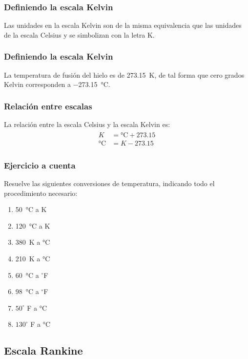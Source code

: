 \documentclass[14pt]{beamer}
\begin{document}
\begin{frame}
\frametitle{Definiendo la escala Kelvin}
Las unidades en la escala Kelvin son de la misma equivalencia que las unidades de la escala Celsius y se simbolizan con la letra K.
\end{frame}
\begin{frame}
\frametitle{Definiendo la escala Kelvin}    
La temperatura de fusión del hielo es de \SI{273.15}{\kelvin}, \pause de tal forma que cero grados Kelvin corresponden a \SI{-273.15}{\degreeCelsius}. 
\end{frame}
\begin{frame}
\frametitle{Relación entre escalas}
La relación entre la escala Celsius y la escala Kelvin es:
\pause
\begin{eqnarray*}
\begin{aligned}
K &= \unit{\degreeCelsius} + 273.15 \\[0.5em]
\unit{\degreeCelsius} &= K - 273.15
\end{aligned}
\end{eqnarray*}
\end{frame}
\begin{frame}
\frametitle{Ejercicio a cuenta}
Resuelve las siguientes conversiones de temperatura, indicando todo el procedimiento necesario:
\pause
\begin{multicols}{2}
\begin{enumerate}
\item \SI{50}{\degreeCelsius} a \unit{\kelvin}
\item \SI{120}{\degreeCelsius} a \unit{\kelvin}
\item \SI{380}{\kelvin} a \unit{\degreeCelsius}
\item \SI{210}{\kelvin} a \unit{\degreeCelsius}
\item \SI{60}{\degreeCelsius} a $^{\circ}$F
\item \SI{98}{\degreeCelsius} a $^{\circ}$F
\item $50^{\circ}$ F a \unit{\degreeCelsius}
\item $130^{\circ}$ F a \unit{\degreeCelsius}    
\end{enumerate}
\end{multicols}
\end{frame}

\subsection{Escala Rankine}
\end{document}
